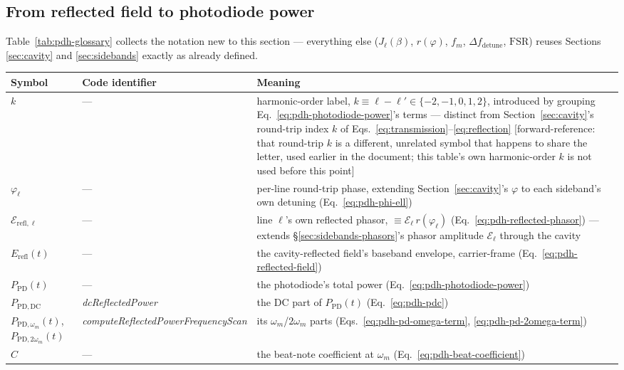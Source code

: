 \documentclass[9pt]{article}
\begin{document}
\subsection{From reflected field to photodiode power}
\label{sec:pdh-photodiode}
Table~\ref{tab:pdh-glossary} collects the notation new to this section ---
everything else (\(J_\ell(\beta)\), \(r(\varphi)\), \(f_m\),
\(\Delta f_{\mathrm{detune}}\), \(\mathrm{FSR}\)) reuses Sections
\ref{sec:cavity} and \ref{sec:sidebands} exactly as already defined.
\begin{table}[H]
\centering
\small
\begin{tabular}{@{}llp{7cm}@{}}
\toprule
Symbol & Code identifier & Meaning \\
\midrule
$k$ & --- & harmonic-order label, $k\equiv\ell-\ell'\in\{-2,-1,0,1,2\}$, introduced by grouping Eq.~\eqref{eq:pdh-photodiode-power}'s terms --- distinct from Section~\ref{sec:cavity}'s round-trip index $k$ of Eqs.~\eqref{eq:transmission}--\eqref{eq:reflection} [forward-reference: that round-trip $k$ is a different, unrelated symbol that happens to share the letter, used earlier in the document; this table's own harmonic-order $k$ is not used before this point] \\
$\varphi_\ell$ & --- & per-line round-trip phase, extending Section~\ref{sec:cavity}'s $\varphi$ to each sideband's own detuning (Eq.~\eqref{eq:pdh-phi-ell}) \\
$\mathcal{E}_{\mathrm{refl},\ell}$ & --- & line $\ell$'s own reflected phasor, $\equiv \mathcal{E}_\ell\, r(\varphi_\ell)$ (Eq.~\eqref{eq:pdh-reflected-phasor}) --- extends \S\ref{sec:sidebands-phasors}'s phasor amplitude $\mathcal{E}_\ell$ through the cavity \\
$E_{\mathrm{refl}}(t)$ & --- & the cavity-reflected field's baseband envelope, carrier-frame (Eq.~\eqref{eq:pdh-reflected-field}) \\
$P_{\mathrm{PD}}(t)$ & --- & the photodiode's total power (Eq.~\eqref{eq:pdh-photodiode-power}) \\
$P_{\mathrm{PD,DC}}$ & \textit{dcReflectedPower} & the DC part of $P_{\mathrm{PD}}(t)$ (Eq.~\eqref{eq:pdh-pdc}) \\
$P_{\mathrm{PD},\omega_m}(t)$, $P_{\mathrm{PD},2\omega_m}(t)$ & \textit{computeReflectedPowerFrequencyScan} & its $\omega_m$/$2\omega_m$ parts (Eqs.~\eqref{eq:pdh-pd-omega-term}, \eqref{eq:pdh-pd-2omega-term}) \\
$C$ & --- & the beat-note coefficient at $\omega_m$ (Eq.~\eqref{eq:pdh-beat-coefficient}) \\

\end{tabular}
\end{table}
\end{document}
